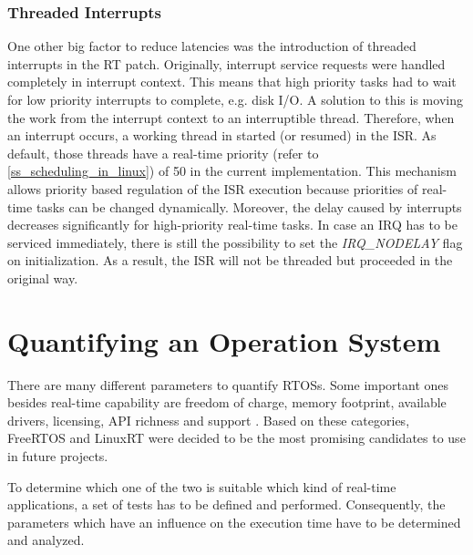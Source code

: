\subsubsection{Threaded Interrupts}\label{ss_threaded_interrupts}
One other big factor to reduce latencies was the introduction of threaded interrupts in the RT patch.
Originally, interrupt service requests were handled completely in interrupt context.
This means that high priority tasks had to wait for low priority interrupts to complete, e.g. disk \ac{I/O}.
A solution to this is moving the work from the interrupt context to an interruptible thread.
Therefore, when an interrupt occurs, a working thread in started (or resumed) in the \ac{ISR}.
As default, those threads have a real-time priority (refer to \ref{ss_scheduling_in_linux}) of 50 in the current implementation.
This mechanism allows priority based regulation of the \ac{ISR} execution because priorities of real-time tasks can be changed dynamically. 
Moreover, the delay caused by interrupts decreases significantly for high-priority real-time tasks.
In case an \ac{IRQ} has to be serviced immediately, there is still the possibility to set the \textit{IRQ\_NODELAY} flag on initialization.
As a result, the \ac{ISR} will not be threaded but proceeded in the original way.

\section{Quantifying an Operation System}
There are many different parameters to quantify \acp{RTOS}.
Some important ones besides real-time capability are freedom of charge, memory footprint, available drivers, licensing, \ac{API} richness and support \cite{Anh:sapeortosfsm}.   
Based on these categories, FreeRTOS and LinuxRT were decided to be the most promising candidates to use in future projects.
\par
To determine which one of the two is suitable which kind of real-time applications, a set of tests has to be defined and performed.
Consequently, the parameters which have an influence on the execution time have to be determined and analyzed.
  